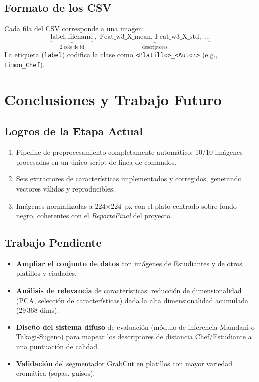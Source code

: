 \documentclass[12pt,a4paper]{article}
\begin{document}
\subsection{Formato de los CSV}

Cada fila del CSV corresponde a una imagen:
\[
  \underbrace{\text{label},\,\text{filename}}_{\text{2 cols de id}},\;
  \underbrace{\text{Feat\_w3\_X\_mean},\,\text{Feat\_w3\_X\_std},\;\ldots}_{\text{descriptores}}
\]
La etiqueta (\texttt{label}) codifica la clase como
\texttt{<Platillo>\_<Autor>} (e.g., \texttt{Limon\_Chef}).

\section{Conclusiones y Trabajo Futuro}

\subsection{Logros de la Etapa Actual}

\begin{enumerate}[nosep]
  \item Pipeline de preprocesamiento completamente automático:
        10/10 imágenes procesadas en un único script de línea de
        comandos.
  \item Seis extractores de características implementados y
        corregidos, generando vectores válidos y reproducibles.
  \item Imágenes normalizadas a 224×224~px con el plato centrado
        sobre fondo negro, coherentes con el \textit{ReporteFinal}
        del proyecto.
\end{enumerate}

\subsection{Trabajo Pendiente}

\begin{itemize}[nosep]
  \item \textbf{Ampliar el conjunto de datos} con imágenes de
        Estudiantes y de otros platillos y ciudades.
  \item \textbf{Análisis de relevancia} de características: reducción
        de dimensionalidad (PCA, selección de características) dada
        la alta dimensionalidad acumulada (29\,368 dims).
  \item \textbf{Diseño del sistema difuso} de evaluación (módulo de
        inferencia Mamdani o Takagi-Sugeno) para mapear los
        descriptores de distancia Chef/Estudiante a una puntuación de
        calidad.
  \item \textbf{Validación} del segmentador GrabCut en platillos con
        mayor variedad cromática (sopas, guisos).
\end{itemize}
\end{document}
